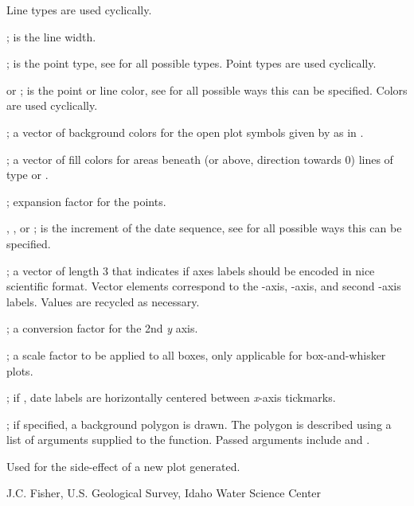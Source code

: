 \documentclass[a4paper]{book}
\begin{document}
\begin{Arguments}
\begin{ldescription}
Line types are used cyclically.
\item[\code{lwd}] ; is the line width.
\item[\code{pch}] ; is the point type, see  for all possible types.
Point types are used cyclically.
\item[\code{col}]  or ; is the point or line color, see  for all possible ways this can be specified.
Colors are used cyclically.
\item[\code{bg}] ; a vector of background colors for the open plot symbols given by  as in .
\item[\code{fill}] ; a vector of fill colors for areas beneath (or above, direction towards 0) lines of type  or .
\item[\code{pt.cex}] ; expansion factor for the points.
\item[\code{seq.date.by}] , , or ; is the increment of the date sequence, see  for all possible ways this can be specified.
\item[\code{scientific}] ; a vector of length 3 that indicates if axes labels should be encoded in nice scientific format.
Vector elements correspond to the -axis, -axis, and second -axis labels.
Values are recycled as necessary.
\item[\code{conversion.factor}] ; a conversion factor for the 2nd \emph{y} axis.
\item[\code{boxwex}] ; a scale factor to be applied to all boxes, only applicable for box-and-whisker plots.
\item[\code{center.date.labels}] ; if , date labels are horizontally centered between \emph{x}-axis tickmarks.
\item[\code{bg.polygon}] ; if specified, a background polygon is drawn.
The polygon is described using a list of arguments supplied to the  function.
Passed arguments include  and .
\end{ldescription}
\end{Arguments}
%
\begin{Value}
Used for the side-effect of a new plot generated.
\end{Value}
%
\begin{Author}\relax
J.C. Fisher, U.S. Geological Survey, Idaho Water Science Center
\end{Author}
\end{document}
